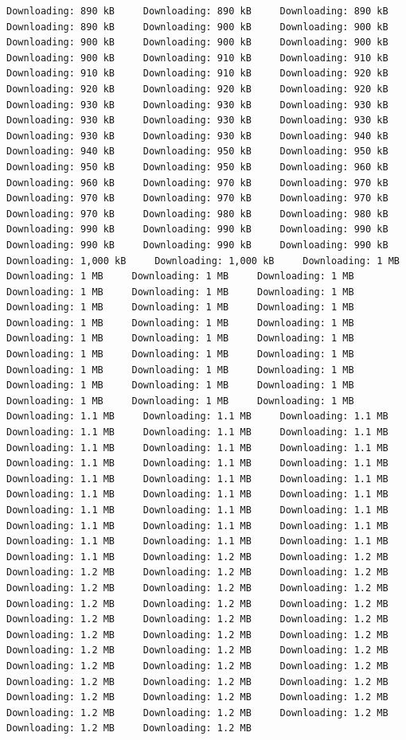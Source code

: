 \documentclass[
]{book}
\begin{document}
\begin{verbatim}
Downloading: 890 kB     Downloading: 890 kB     Downloading: 890 kB     Downloading: 890 kB     Downloading: 900 kB     Downloading: 900 kB     Downloading: 900 kB     Downloading: 900 kB     Downloading: 900 kB     Downloading: 900 kB     Downloading: 910 kB     Downloading: 910 kB     Downloading: 910 kB     Downloading: 910 kB     Downloading: 920 kB     Downloading: 920 kB     Downloading: 920 kB     Downloading: 920 kB     Downloading: 930 kB     Downloading: 930 kB     Downloading: 930 kB     Downloading: 930 kB     Downloading: 930 kB     Downloading: 930 kB     Downloading: 930 kB     Downloading: 930 kB     Downloading: 940 kB     Downloading: 940 kB     Downloading: 950 kB     Downloading: 950 kB     Downloading: 950 kB     Downloading: 950 kB     Downloading: 960 kB     Downloading: 960 kB     Downloading: 970 kB     Downloading: 970 kB     Downloading: 970 kB     Downloading: 970 kB     Downloading: 970 kB     Downloading: 970 kB     Downloading: 980 kB     Downloading: 980 kB     Downloading: 990 kB     Downloading: 990 kB     Downloading: 990 kB     Downloading: 990 kB     Downloading: 990 kB     Downloading: 990 kB     Downloading: 1,000 kB     Downloading: 1,000 kB     Downloading: 1 MB     Downloading: 1 MB     Downloading: 1 MB     Downloading: 1 MB     Downloading: 1 MB     Downloading: 1 MB     Downloading: 1 MB     Downloading: 1 MB     Downloading: 1 MB     Downloading: 1 MB     Downloading: 1 MB     Downloading: 1 MB     Downloading: 1 MB     Downloading: 1 MB     Downloading: 1 MB     Downloading: 1 MB     Downloading: 1 MB     Downloading: 1 MB     Downloading: 1 MB     Downloading: 1 MB     Downloading: 1 MB     Downloading: 1 MB     Downloading: 1 MB     Downloading: 1 MB     Downloading: 1 MB     Downloading: 1 MB     Downloading: 1 MB     Downloading: 1 MB     Downloading: 1.1 MB     Downloading: 1.1 MB     Downloading: 1.1 MB     Downloading: 1.1 MB     Downloading: 1.1 MB     Downloading: 1.1 MB     Downloading: 1.1 MB     Downloading: 1.1 MB     Downloading: 1.1 MB     Downloading: 1.1 MB     Downloading: 1.1 MB     Downloading: 1.1 MB     Downloading: 1.1 MB     Downloading: 1.1 MB     Downloading: 1.1 MB     Downloading: 1.1 MB     Downloading: 1.1 MB     Downloading: 1.1 MB     Downloading: 1.1 MB     Downloading: 1.1 MB     Downloading: 1.1 MB     Downloading: 1.1 MB     Downloading: 1.1 MB     Downloading: 1.1 MB     Downloading: 1.1 MB     Downloading: 1.1 MB     Downloading: 1.1 MB     Downloading: 1.1 MB     Downloading: 1.2 MB     Downloading: 1.2 MB     Downloading: 1.2 MB     Downloading: 1.2 MB     Downloading: 1.2 MB     Downloading: 1.2 MB     Downloading: 1.2 MB     Downloading: 1.2 MB     Downloading: 1.2 MB     Downloading: 1.2 MB     Downloading: 1.2 MB     Downloading: 1.2 MB     Downloading: 1.2 MB     Downloading: 1.2 MB     Downloading: 1.2 MB     Downloading: 1.2 MB     Downloading: 1.2 MB     Downloading: 1.2 MB     Downloading: 1.2 MB     Downloading: 1.2 MB     Downloading: 1.2 MB     Downloading: 1.2 MB     Downloading: 1.2 MB     Downloading: 1.2 MB     Downloading: 1.2 MB     Downloading: 1.2 MB     Downloading: 1.2 MB     Downloading: 1.2 MB     Downloading: 1.2 MB     Downloading: 1.2 MB     Downloading: 1.2 MB     Downloading: 1.2 MB     Downloading: 1.2 MB     Downloading: 1.2 MB     
\end{verbatim}
\end{document}

